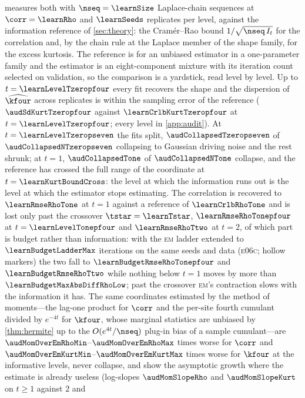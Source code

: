 measures both with $\nseq=\learnSize$ Laplace-chain sequences at
$\corr=\learnRho$ and $\learnSeeds$ replicates per level, against the information
reference of \cref{sec:theory}: the Cram\'er--Rao bound $1/\sqrt{\nseq\,I_t}$ for the
correlation and, by the chain rule at the Laplace member of the shape family, for the
excess kurtosis. The reference is for an unbiased estimator in a one-parameter family and
the estimator is an eight-component mixture with its iteration count selected on
validation, so the comparison is a yardstick, read level by level. Up to
$t=\learnLevelTzeropfour$ every fit recovers the shape and the dispersion of
$\widehat\kfour$ across replicates is within the sampling error of the reference
($\audSdKurtTzeropfour$ against $\learnCrlbKurtTzeropfour$ at $t=\learnLevelTzeropfour$;
every level in \cref{app:audit}). At $t=\learnLevelTzeropseven$ the fits split,
$\audCollapsedTzeropseven$ of $\audCollapsedNTzeropseven$ collapsing to Gaussian
driving noise and the rest shrunk; at $t=1$, $\audCollapsedTone$ of $\audCollapsedNTone$
collapse, and the reference has crossed the full range of the coordinate at
$t=\learnKurtBoundCross$: the level at which the information runs out is the level at
which the estimator stops estimating. The correlation is recovered to $\learnRmseRhoTone$
at $t=1$ against a reference of $\learnCrlbRhoTone$ and is lost only past the crossover
$\tstar=\learnTstar$, $\learnRmseRhoTonepfour$ at $t=\learnLevelTonepfour$ and
$\learnRmseRhoTtwo$ at $t=2$, of which part is budget rather than information: with the
\textsc{em} ladder extended to $\learnBudgetLadderMax$ iterations on the same seeds and
data (\textsc{e06c}; hollow markers) the two fall to $\learnBudgetRmseRhoTonepfour$ and
$\learnBudgetRmseRhoTtwo$ while nothing below $t=1$ moves by more than
$\learnBudgetMaxAbsDiffRhoLow$; past the crossover \textsc{em}'s contraction slows with
the information it has. The same coordinates estimated by the method of moments---the
lag-one product for $\corr$ and the per-site fourth cumulant divided by $e^{-4t}$ for
$\kfour$, whose marginal statistics are unbiased by \cref{thm:hermite} up to the
$O(e^{4t}/\nseq)$ plug-in bias of a sample cumulant---are
$\audMomOverEmRhoMin$--$\audMomOverEmRhoMax$ times worse for $\corr$ and
$\audMomOverEmKurtMin$--$\audMomOverEmKurtMax$ times worse for $\kfour$ at the informative
levels, never collapse, and show the asymptotic growth where the estimate is already
useless (log-slopes $\audMomSlopeRho$ and $\audMomSlopeKurt$ on $t\ge1$ against $2$ and
